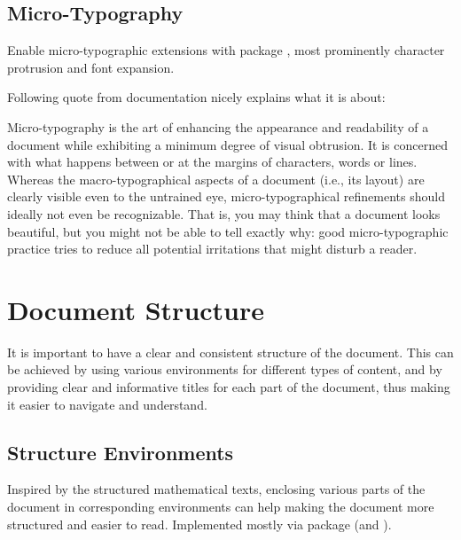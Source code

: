 \subsection{\texorpdfstring{Micro-\!Typography}{Micro-Typography}}%
\label{sub:Micro-Typography}

Enable micro-typographic extensions with package , most prominently character protrusion and font expansion.

Following quote from  documentation nicely explains what it is about:
\begin{displayquote}
    Micro-typography is the art of enhancing the appearance and readability of a
    document while exhibiting a minimum degree of visual obtrusion.
    It is concerned with what happens between or at the margins of characters, words or lines.
    Whereas the macro-typographical aspects of a document (i.e., its layout) are clearly visible even to the untrained eye, micro-typographical refinements should ideally not even be recognizable.
    That is, you may think that a document looks beautiful, but you might not be able to tell exactly why: good micro-typographic practice tries to reduce all potential irritations that might disturb a reader.
\end{displayquote}


\section{Document Structure}%
\label{sec:Document Structure}

It is important to have a clear and consistent structure of the document.
This can be achieved by using various environments for different types of content, and by providing clear and informative titles for each part of the document, thus making it easier to navigate and understand.

\subsection{Structure Environments}%
\label{sub:Structure Environments}

Inspired by the structured mathematical texts, enclosing various parts of the document in corresponding environments can help making the document more structured and easier to read.
Implemented mostly via  package (and ).

